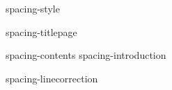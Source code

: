 \environment spacing-style

\startdocument

    \component spacing-titlepage

    \startfrontmatter
        \component spacing-contents
        \component spacing-introduction
    \stopfrontmatter

    \startbodymatter
        \component spacing-linecorrection
    \stopbodymatter

\stopdocument
